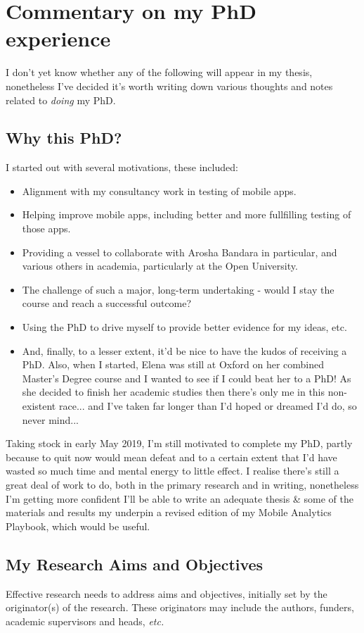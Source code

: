 \chapter{Commentary on my PhD experience}
I don't yet know whether any of the following will appear in my thesis, nonetheless I've decided it's worth writing down various thoughts and notes related to \textit{doing} my PhD.

\section{Why this PhD?}
I started out with several motivations, these included:
\begin{itemize}
    \item Alignment with my consultancy work in testing of mobile apps.
    \item Helping improve mobile apps, including better and more fullfilling testing of those apps.
    \item Providing a vessel to collaborate with Arosha Bandara in particular, and various others in academia, particularly at the Open University.
    \item The challenge of such a major, long-term undertaking - would I stay the course and reach a successful outcome?
    \item Using the PhD to drive myself to provide better evidence for my ideas, etc.
    \item And, finally, to a lesser extent, it'd be nice to have the kudos of receiving a PhD. Also, when I started, Elena was still at Oxford on her combined Master's Degree course and I wanted to see if I could beat her to a PhD! As she decided to finish her academic studies then there's only me in this non-existent race... and I've taken far longer than I'd hoped or dreamed I'd do, so never mind...
\end{itemize}

Taking stock in early May 2019, I'm still motivated to complete my PhD, partly because to quit now would mean defeat and to a certain extent that I'd have wasted so much time and mental energy to little effect. I realise there's still a great deal of work to do, both in the primary research and in writing, nonetheless I'm getting more confident I'll be able to write an adequate thesis \& some of the materials and results my underpin a revised edition of my Mobile Analytics Playbook, which would be useful.

\section{My Research Aims and Objectives}
Effective research needs to address aims and objectives, initially set by the originator(s) of the research. These originators may include the authors, funders, academic supervisors and heads, \emph{etc.}

